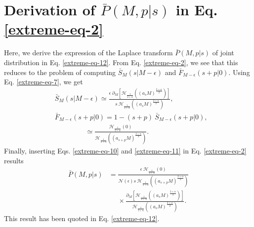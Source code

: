 \documentclass[showpacs,amsmath,amssymb,aps,pre,twocolumn,]{revtex4-1}
\def\greenw#1{{\color{black} #1}}
\begin{document}
\section{Derivation of $\bar{P}(M, p|s)$ in Eq. \eqref{extreme-eq-2}}
\label{appen-exp}
Here, we derive the expression of the Laplace transform $\bar{P}(M, p|s)$ of joint distribution in Eq. \eqref{extreme-eq-12}. From 
Eq. \eqref{extreme-eq-2}, we see that this reduces to the problem of computing $\bar{S}_M(s|M-\epsilon)$ and $\bar{F}_{M-\epsilon}\left(s+p|0 \right)$. Using Eq. \eqref{extreme-eq-7}, we get
\begin{align}
& \bar{S}_M(s|M-\epsilon) \simeq \frac{\epsilon~ \partial _M  \left[\mathcal{H}_{\frac{1}{2+\alpha}} \left( (a_s M)^{\frac{2+\alpha}{2}} \right) \right]}{s ~\mathcal{H}_{\frac{1}{2+\alpha}} \left( (a_s M)^{\frac{2+\alpha}{2}} \right) }, \label{extreme-eq-10}\\
& \bar{F}_{M-\epsilon}\left(s+p|0 \right) = 1-(s+p)~\bar{S}_{M-\epsilon}(s+p|0),  \nonumber \\
& ~~~~~~~~~~~~~~~~~~~~\simeq \frac{\mathcal{H}_{\frac{1}{2+\alpha}} \left(0 \right)}{\mathcal{H}_{\frac{1}{2+\alpha}} \left( (a_{s+p} M)^{\frac{2+\alpha}{2}} \right)}.
\label{extreme-eq-11}
\end{align}
Finally, inserting Eqs. \eqref{extreme-eq-10} and \eqref{extreme-eq-11} in Eq. \eqref{extreme-eq-2} results
\begin{align}
\bar{P}(M, p|s)&= \frac{ \epsilon ~ \mathcal{H}_{\frac{1}{2+\alpha}} \left(0 \right) }{\mathcal{N} (\epsilon)s~\mathcal{H}_{\frac{1}{2+\alpha}} \left( (a_{s+p} M)^{\frac{2+\alpha}{2}} \right)}
\nonumber  \\
& ~~~~~~\times \frac{\partial _M \left[ \mathcal{H}_{\frac{1}{2+\alpha}} \left( (a_s M)^{\frac{2+\alpha}{2}} \right) \right]}{ \mathcal{H}_{\frac{1}{2+\alpha}} \left( (a_s M)^{\frac{2+\alpha}{2}} \right) } . 
\end{align}
This result has been quoted in Eq. \eqref{extreme-eq-12}.
\end{document}

